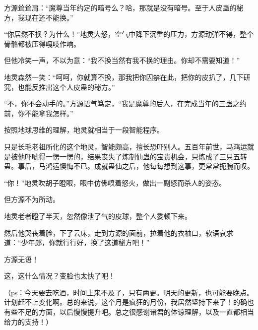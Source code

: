 \begin{this_body}
方源耸耸肩：“魔尊当年约定的暗号么？哈，那就是没有暗号。至于人皮蛊的秘方，我现在还不能换。”

“你居然不换？为什么！”地灵大怒，空气中降下沉重的压力，方源动弹不得，整个骨骼都被压得嘎吱作响。

但他冷笑一声，不以为意：“我不换当然有我不换的理由。你却不需要知道！”

地灵森然一笑：“呵呵，你就算不换，那我把你囚禁在此，把你的皮扒了，几下研究，也能反推出这个人皮蛊的秘方。”

“不，你不会动手的。”方源语气笃定，“我是魔尊的后人，在完成当年的三蛊之约前，你不能拿我怎样。”

按照地球思维的理解，地灵就相当于一段智能程序。

只是长毛老祖所化的这个地灵，智能颇高，擅长恐吓别人。五百年前世，马鸿运就是被他吓唬得一愣一愣的，结果丧失了炼制仙蛊的宝贵机会，只炼成了三只五转蛊。事后，马鸿运懊悔不已。成就蛊仙之后，他每每想到这事，更常常扼腕而叹。

“你！”地灵吹胡子瞪眼，眼中仿佛喷着怒火，做出一副怒而杀人的姿态。

但方源不为所动。

地灵老者瞪了半天，忽然像泄了气的皮球，整个人委顿下来。

然后他哭丧着脸，下了云床，走到方源的面前，拉着他的衣袖口，软语哀求道：“少年郎，你就行行好，换了这道秘方吧！”

方源无语！

这，这什么情况？变脸也太快了吧！

（ps：今天要去吃酒，时间上来不及了，只有两更。明天的更新，也可能要晚点。计划赶不上变化啊。总的来说，这个月是疯狂的月份，我居然坚持下来了！的确也有些不足的方面，以后慢慢提升吧。总之很感谢诸君的体谅理解，以及一直都相当给力的支持！）

\end{this_body}

